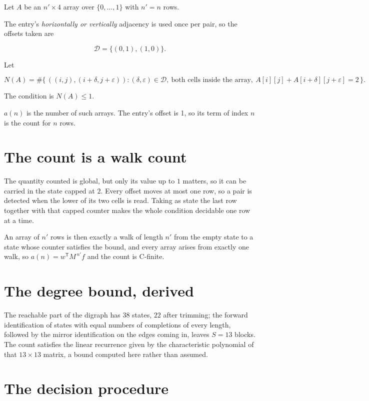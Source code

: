 \documentclass[11pt]{article}
\theoremstyle{definition}
\begin{document}
Let $A$ be an $n' \times 4$ array over $\{0,\dots,1\}$ with $n' = n$ rows.

The entry's {\itshape horizontally or vertically} adjacency is used once per pair, so the offsets taken are

\[\mathcal{D} = \{(0,1), (1,0)\}.\]

Let

\[N(A) = \#\bigl\{\,((i,j),(i{+}\delta,j{+}\varepsilon)) : (\delta,\varepsilon) \in \mathcal{D},\ \text{both cells inside the array},\ A[i][j] + A[i{+}\delta][j{+}\varepsilon] = 2\,\bigr\}.\]

The condition is $N(A) \le 1$.

$a(n)$ is the number of such arrays. The entry's offset is 1, so its term of index $n$ is the count for $n$ rows.

\section{The count is a walk count}

The quantity counted is global, but only its value up to $1$ matters, so it can be carried in the state capped at $2$. Every offset moves at most one row, so a pair is detected when the lower of its two cells is read. Taking as state the last row together with that capped counter makes the whole condition decidable one row at a time.

An array of $n'$ rows is then exactly a walk of length $n'$ from the empty state to a state whose counter satisfies the bound, and every array arises from exactly one walk, so $a(n) = w^{\mathsf T}M^{\,n'}f$ and the count is C-finite.

\section{The degree bound, derived}

The reachable part of the digraph has $38$ states, $22$ after trimming; the forward identification of states with equal numbers of completions of every length, followed by the mirror identification on the edges coming in, leaves $S = 13$ blocks. The count satisfies the linear recurrence given by the characteristic polynomial of that $13\times13$ matrix, a bound computed here rather than assumed.

\section{The decision procedure}
\end{document}
